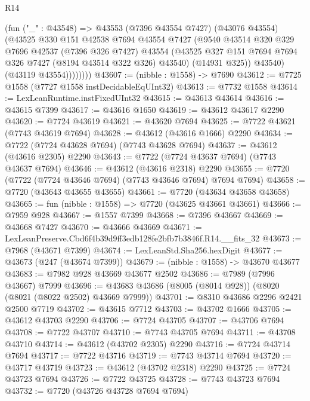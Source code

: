 \begin{lexlean}{R14}
\begin{coremodule}
                (fun ("_" : @43548) =>
                @43553
                  (@7396 @43554 @7427)
                  (@43076 @43554)
                  (@43525
                    @330
                    @151
                    @42538
                    @7694
                    @43554
                    @7427
                    (@9540
                      @43514
                      @320
                      @329
                      @7696
                      @42537
                      (@7396 @326 @7427)
                      @43554
                      (@43525 @327 @151 @7694 @7694 @326 @7427 (@8194 @43514 @322 @326) @43540)
                      (@14931 @325))
                    @43540)
                  (@43119 @43554))))))))
@43607 := (nibble : @1558) -> @7690
@43612 := @7725 @1558 (@7727 @1558 instDecidableEqUInt32)
@43613 := @7732 @1558
@43614 := LexLeanRuntime.instFixedUInt32
@43615 := @43613 @43614
@43616 := @43615 @7399
@43617 := @43616 @1650
@43619 := @43612 @43617 @2290
@43620 := @7724 @43619
@43621 := @43620 @7694
@43625 := @7722 @43621 (@7743 @43619 @7694)
@43628 := @43612 (@43616 @1666) @2290
@43634 := @7722 (@7724 @43628 @7694) (@7743 @43628 @7694)
@43637 := @43612 (@43616 @2305) @2290
@43643 := @7722 (@7724 @43637 @7694) (@7743 @43637 @7694)
@43646 := @43612 (@43616 @2318) @2290
@43655 := @7720 (@7722 (@7724 @43646 @7694) (@7743 @43646 @7694) @7694 @7694)
@43658 := @7720 (@43643 @43655 @43655)
@43661 := @7720 (@43634 @43658 @43658)
@43665 := fun (nibble : @1558) => @7720 (@43625 @43661 @43661)
@43666 := @7959 @928
@43667 := @1557 @7399
@43668 := @7396 @43667
@43669 := @43668 @7427
@43670 := @43666 @43669
@43671 := LexLeanPreserve.Cbd6f4b39d9ff3edb128fe2bfb7b3846f.R14.__fits_32
@43673 := @7968 (@43671 @7399)
@43674 := LexLeanStd.Sha256.hexDigit
@43677 := @43673 (@247 (@43674 @7399))
@43679 := (nibble : @1558) -> @43670 @43677
@43683 := @7982 @928 @43669 @43677 @2502
@43686 := @7989 (@7996 @43667) @7999
@43696 := @43683 @43686 (@8005 (@8014 @928)) (@8020 (@8021 (@8022 @2502) @43669 @7999))
@43701 := @8310 @43686 @2296 @2421 @2500 @7719
@43702 := @43615 @7712
@43703 := @43702 @1666
@43705 := @43612 @43703 @2290
@43706 := @7724 @43705
@43707 := @43706 @7694
@43708 := @7722 @43707
@43710 := @7743 @43705 @7694
@43711 := @43708 @43710
@43714 := @43612 (@43702 @2305) @2290
@43716 := @7724 @43714 @7694
@43717 := @7722 @43716
@43719 := @7743 @43714 @7694
@43720 := @43717 @43719
@43723 := @43612 (@43702 @2318) @2290
@43725 := @7724 @43723 @7694
@43726 := @7722 @43725
@43728 := @7743 @43723 @7694
@43732 := @7720 (@43726 @43728 @7694 @7694)

\end{coremodule}
\end{lexlean}

